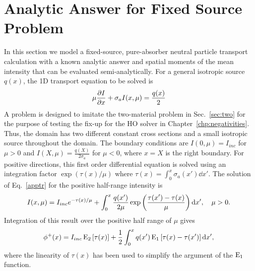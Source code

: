 \section{Analytic Answer for Fixed Source Problem}
\label{sec:analytic_neutronics}

In this section we model a fixed-source, pure-absorber neutral particle transport
calculation with a known analytic answer and spatial moments of the mean intensity that can be evaluated
semi-analytically.  For a general
isotropic source $q(x)$, the 1D transport equation to be solved is 
\begin{equation}\label{apptr}
    \mu \frac{\partial I}{\partial x} + \sigma_a I(x,\mu) = \frac{q(x)}{2}
\end{equation}
A problem is designed to imitate the two-material problem in Sec.~\ref{sec:two} for the
purpose of testing the fix-up for the HO solver in Chapter~\ref{chp:negativities}.  Thus, the domain has two
different constant cross sections and a small isotropic source throughout the domain.  
The boundary conditions are $I(0,\mu)=I_{inc}$ for $\mu>0$ and
$I(X,\mu)=\frac{q(X)}{2\sigma_a}$ for
$\mu<0$, where $x=X$ is the right boundary.  
For positive directions, this first order differential equation is solved using an integration factor
$\exp(\tau(x)/\mu)$ where $\tau(x) = \int_{0}^x \sigma_a(x')\dd x'$.
The solution of Eq.~\eqref{apptr} for the positive half-range intensity is 
\begin{equation}
    I(x,\mu) =  I_{inc}e^{-\tau(x)/\mu} + \int_0^x \frac{q(x')}{2\mu}
    \exp\left(\frac{\displaystyle \tau(x')-\tau(x)}{\displaystyle \mu}\right) \mathrm{d} x',\quad \mu>0.
\end{equation}
Integration of this result over the positive half range of $\mu$ gives
\begin{equation}\label{e122}
    \phi^+(x) = I_{inc}\operatorname{E}_{2}\left[\tau(x)\right] + \frac{1}{2}\int_0^x q(x')\operatorname{E}_{1}\left[\tau(x)
        - \tau(x')\right]
    \mathrm{d} x',
\end{equation}
where the linearity of $\tau(x)$ has been used to simplify the argument of the $\operatorname{E}_{1}$
function.

